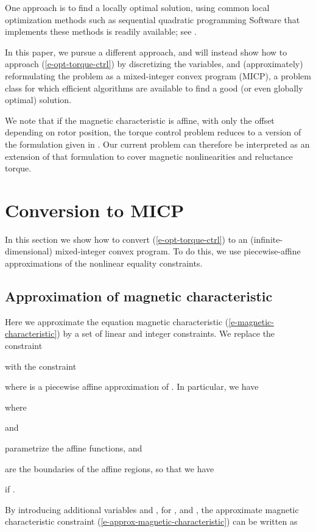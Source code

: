 \documentclass[11pt]{article}
\begin{document}
One approach is to find a locally optimal solution,
using common local optimization methods such as sequential quadratic programming
Software that implements these methods is readily available;
see \cite{nocedal2006numerical}.


In this paper, we pursue a different approach,
and will instead show how to approach (\ref{e-opt-torque-ctrl})
by discretizing the variables,
and (approximately) reformulating the problem as a mixed-integer convex program (MICP),
a problem class for which efficient algorithms are available
to find a good (or even globally optimal) solution.


We note that if the magnetic characteristic is affine,
with only the offset depending on rotor position,
the torque control problem reduces to a version of the formulation given in 
\cite{moehle2015optimal}.
Our current problem can therefore be interpreted as an extension
of that formulation to cover magnetic nonlinearities and reluctance torque.

\section{Conversion to MICP}
\label{s-micp}
In this section we show how to convert (\ref{e-opt-torque-ctrl}) to an
(infinite-dimensional) mixed-integer convex program.
To do this,
we use piecewise-affine approximations of the nonlinear equality constraints.

\subsection{Approximation of magnetic characteristic}
Here we approximate the equation magnetic characteristic
(\ref{e-magnetic-characteristic})
by a set of linear and integer constraints.
We replace the constraint 

with the constraint

where  is a piecewise affine approximation of .
In particular, we have

where 

and

parametrize the affine functions, and 

are the boundaries of the affine regions, so that we have

if .

By introducing additional variables  and ,
for , and ,
the approximate magnetic characteristic constraint (\ref{e-approx-magnetic-characteristic})
can be written as 
\end{document}
